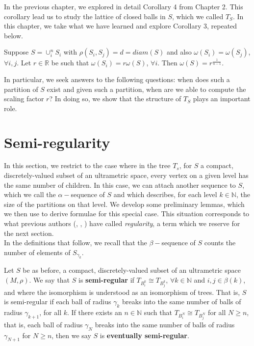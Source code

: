 In the previous chapter, we explored in detail Corollary 4 from Chapter 2. This corollary lead us to study the lattice of closed balls in $S$, which we called $T_S$. In this chapter, we take what we have learned and explore Corollary 3, repeated below.\\

\begin{corollary*}
	Suppose $S = \cup_i^n S_i$ with $\rho(S_i, S_j)=d=diam(S)$ and also $\omega(S_i)=\omega(S_j)$, $\forall i,j$.  Let $r \in \mathbb{R}$ be such that $\omega(S_i)=r\omega(S)$, $\forall i$. Then $\omega(S) = r^{\frac{1}{n-1}}$. 
\end{corollary*}

In particular, we seek answers to the following questions: when does such a partition of $S$ exist and given such a partition, when are we able to compute the scaling factor $r$? In doing so, we show that the structure of $T_S$ plays an important role. 


\section{Semi-regularity}
In this section, we restrict to the case where in the tree $T_s$, for $S$ a compact, discretely-valued subset of an ultrametric space, every vertex on a given level has the same number of children. In this case, we can attach another sequence to $S$, which we call the $\alpha-$sequence of $S$ and which describes, for each level $k \in \mathbb{N}$, the size of the partitions on that level. We develop some preliminary lemmas, which we then use to derive formulae for this special case. This situation corresponds to what previous authors (\cite{amice}, \cite{cef}, \cite{fp}) have called \textit{regularity}, a term which we reserve for the next section. \\

In the definitions that follow, we recall that the $\beta-$sequence of $S$ counts the number of elements of $S_{\gamma_k}$.\\


\begin{definition}
Let $S$ be as before, a compact, discretely-valued subset of an ultrametric space $(M, \rho)$. We say that $S$ is \textbf{semi-regular} if $T_{B^k_i} \cong T_{B^k_j}$, $\forall k \in \mathbb{N}$ and  $i,j \in \beta(k)$, and where the isomorphism is understood as an isomorphism of trees. That is, $S$ is semi-regular if each ball of radius $\gamma_k$ breaks into the same number of balls of radius $\gamma_{k+1}$, for all $k$. If there exists an $n \in \mathbb{N}$ such that $T_{B^N_i} \cong T_{B^N_j}$ for all $N \geq n$, that is,  each ball of radius $\gamma_N$ breaks into the same number of balls of radius $\gamma_{N+1}$ for $N \geq n$, then we say $S$ is \textbf{eventually semi-regular}.
\end{definition}


